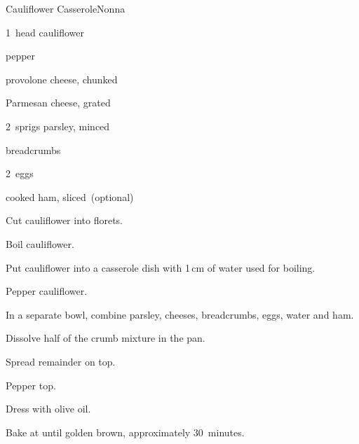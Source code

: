 \begin{recipe}{Cauliflower Casserole}{Nonna}{}

\begin{ingredients}
\item 1~head cauliflower
\item pepper
\item \C{\half} provolone cheese, chunked
\item \C{\half} Parmesan cheese, grated
\item 2~sprigs parsley, minced
\item \C{\threequarter} breadcrumbs
\item 2~eggs
\item \C{\quarter} cooked ham, sliced~(optional)
\end{ingredients}

\begin{directions}
\item Cut cauliflower into florets.
\item Boil cauliflower.
\item Put cauliflower into a casserole dish with 1\,cm of water used for boiling.
\item Pepper cauliflower.
\item In a separate bowl, combine parsley, cheeses, breadcrumbs, eggs, \C{\quarter} water and ham.
\item Dissolve half of the crumb mixture in the pan.
\item Spread remainder on top.
\item Pepper top.
\item Dress with olive oil.
\item Bake at  until golden brown, approximately 30~minutes.
\end{directions}

\end{recipe}
